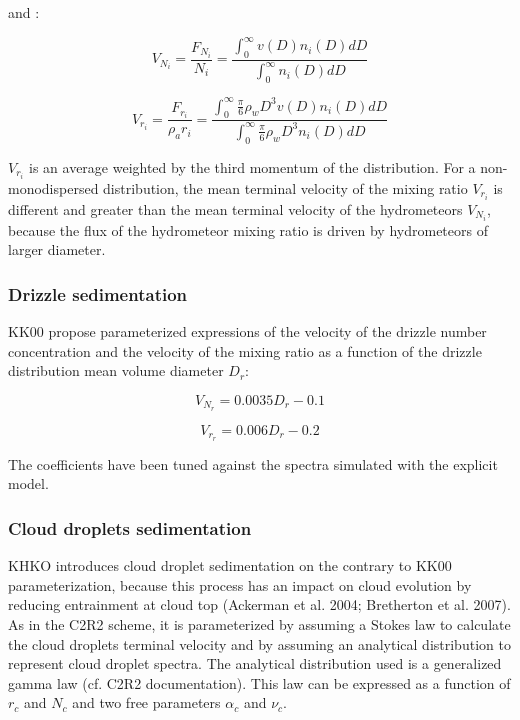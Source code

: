 \noindent and : 

\begin{equation}
V_{N_i}=\frac{F_{N_i}}{N_i}=\frac{\int_{0}^{\infty}v(D)n_i(D)dD}{\int_{0}^{\infty}n_i(D)dD}
\end{equation}

\begin{equation}
V_{r_i}=\frac{F_{r_i}}{\rho_ar_i}=\frac{\int_{0}^{\infty}\frac{\pi}{6}\rho_wD^3v(D)n_i(D)dD}{\int_{0}^{\infty}\frac{\pi}{6}\rho_wD^3n_i(D)dD}
\end{equation}


\noindent $V_{r_i}$ is an average weighted by the third momentum of the distribution. 
For a non-monodispersed distribution, the mean terminal velocity of the mixing ratio $V_{r_i}$ is different and greater than the mean terminal velocity of the hydrometeors $V_{N_i}$, because the flux of the hydrometeor mixing ratio is driven by hydrometeors of larger diameter.

\subsubsection{Drizzle sedimentation}

KK00 propose parameterized expressions of the velocity of the drizzle number concentration and the velocity of the mixing ratio as a function of the drizzle distribution mean volume diameter $D_r$:

\begin{equation}
V_{N_r}=0.0035D_r-0.1
\end{equation}
 
\begin{equation}
V_{r_r}=0.006D_r-0.2
\end{equation}


\noindent The coefficients have been tuned against the spectra simulated with the explicit model.

\subsubsection{Cloud droplets sedimentation}

KHKO introduces cloud droplet sedimentation on the contrary to 
KK00 parameterization, because this process has an impact on cloud evolution by reducing entrainment at cloud top (Ackerman et al. 2004; Bretherton et al. 2007). As in the C2R2 scheme, it is parameterized by assuming a Stokes law to calculate the cloud droplets terminal velocity and by assuming an analytical distribution to represent cloud droplet spectra. The analytical distribution used is a generalized gamma law (cf. C2R2 documentation). This law can be expressed as a function of $r_c$ and $N_c$ and two free parameters $\alpha_c$ and $\nu_c$. 

